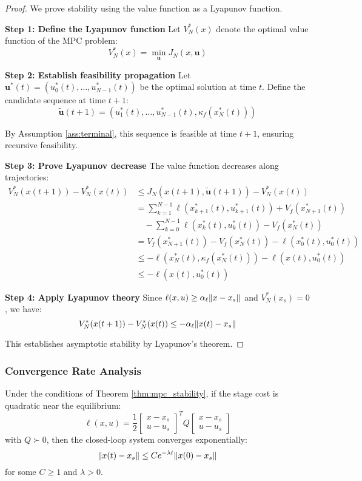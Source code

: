 \begin{proof}
We prove stability using the value function as a Lyapunov function.

\textbf{Step 1: Define the Lyapunov function}
Let $V_N^*(x)$ denote the optimal value function of the MPC problem:
$$V_N^*(x) = \min_{\mathbf{u}} J_N(x, \mathbf{u})$$

\textbf{Step 2: Establish feasibility propagation}
Let $\mathbf{u}^*(t) = (u_0^*(t), \ldots, u_{N-1}^*(t))$ be the optimal solution at time $t$. 
Define the candidate sequence at time $t+1$:
$$\tilde{\mathbf{u}}(t+1) = (u_1^*(t), \ldots, u_{N-1}^*(t), \kappa_f(x_N^*(t)))$$

By Assumption \ref{ass:terminal}, this sequence is feasible at time $t+1$, ensuring recursive feasibility.

\textbf{Step 3: Prove Lyapunov decrease}
The value function decreases along trajectories:
\begin{align}
V_N^*(x(t+1)) - V_N^*(x(t)) &\leq J_N(x(t+1), \tilde{\mathbf{u}}(t+1)) - V_N^*(x(t)) \\
&= \sum_{k=1}^{N-1} \ell(x_{k+1}^*(t), u_{k+1}^*(t)) + V_f(x_{N+1}^*(t)) \\
&\quad - \sum_{k=0}^{N-1} \ell(x_k^*(t), u_k^*(t)) - V_f(x_N^*(t)) \\
&= V_f(x_{N+1}^*(t)) - V_f(x_N^*(t)) - \ell(x_0^*(t), u_0^*(t)) \\
&\leq -\ell(x_N^*(t), \kappa_f(x_N^*(t))) - \ell(x(t), u_0^*(t)) \\
&\leq -\ell(x(t), u_0^*(t))
\end{align}

\textbf{Step 4: Apply Lyapunov theory}
Since $\ell(x, u) \geq \alpha_\ell \lVert x - x_s\rVert$ and $V_N^*(x_s) = 0$, we have:
$$V_N^*(x(t+1)) - V_N^*(x(t)) \leq -\alpha_\ell \lVert x(t) - x_s\rVert$$

This establishes asymptotic stability by Lyapunov's theorem.
\end{proof}

\subsubsection{Convergence Rate Analysis}

\begin{theorem}
\label{thm:mpc_rate}
Under the conditions of Theorem \ref{thm:mpc_stability}, if the stage cost is quadratic near the equilibrium:
$$\ell(x, u) = \frac{1}{2} \begin{bmatrix} x - x_s \\ u - u_s \end{bmatrix}^T Q \begin{bmatrix} x - x_s \\ u - u_s \end{bmatrix}$$
with $Q \succ 0$, then the closed-loop system converges exponentially:
$$\lVert x(t) - x_s\rVert \leq C e^{-\lambda t} \lVert x(0) - x_s\rVert$$
for some $C \geq 1$ and $\lambda > 0$.
\end{theorem}

